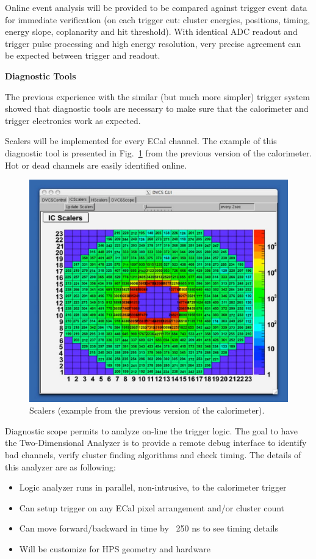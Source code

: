 Online event analysis will be provided to be compared against trigger event data for immediate verification (on each trigger cut: cluster energies, positions, timing, energy slope, coplanarity and hit threshold). With identical ADC readout and trigger pulse processing and high energy resolution, very precise agreement can be expected between trigger and readout.


{\bf Diagnostic Tools}

The previous experience with the similar (but much more simpler) trigger system showed that diagnostic tools are necessary to make sure that the calorimeter and trigger electronics work as expected. 

Scalers will be implemented for every ECal channel. The example of this diagnostic tool is presented in Fig.~\ref{fig:dvcs_beam}
from the previous version of the calorimeter. Hot or dead channels are easily identified online.
\begin{figure}[h]
\includegraphics[scale=0.6]{daq_trigger/figures/dvcs_beam}
\caption{\small{Scalers (example from the previous version of the calorimeter).}}
\label{fig:dvcs_beam}
\end{figure}
Diagnostic scope permits to analyze on-line  the trigger logic. The goal to have  the Two-Dimensional Analyzer
 is to provide a remote debug interface to identify bad channels, verify cluster finding algorithms and check timing.
 The details of this analyzer are as following:
 
\begin{itemize}
\item Logic analyzer runs in parallel, non-intrusive, to the calorimeter trigger
\item Can setup trigger on any ECal pixel arrangement and/or cluster count
\item Can move forward/backward in time by ~250 ns to see timing details
\item Will be customize for HPS geometry and hardware
\end{itemize}

